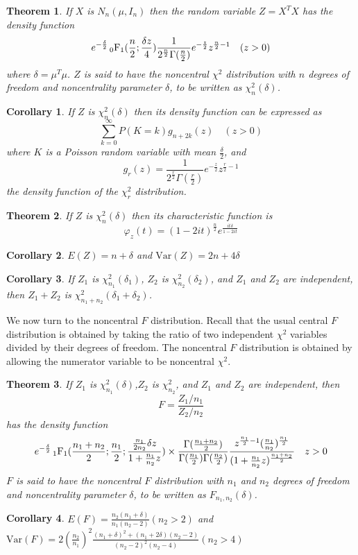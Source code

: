 \documentclass{article}
\newtheorem{Thm}{Theorem}[section]
\newtheorem{Cor}{Corollary}[Thm]
\theoremstyle{definition}
\begin{document}
\begin{Thm}
If $X$ is $N_n(\mu,I_n)$ then the random variable $Z=X^TX$ has the density function
\[e^{-\frac{\delta}{2}}\sideset{_0}{_1}{\operatorname{F}}(\frac{n}{2};\frac{\delta z}{4})\frac{1}{2^{\frac{n}{2}}\Gamma(\frac{n}{2})}e^{-\frac{z}{2}}z^{\frac{n}{2}-1}\quad(z>0)\]
where $\delta=\mu^T\mu$. $Z$ is said to have the noncentral $\chi^2$ distribution with $n$ degrees of freedom and noncentrality parameter $\delta$, to be written as $\chi^2_n(\delta)$.
\end{Thm}
\begin{Cor}
If $Z$ is $\chi^2_n(\delta)$ then its density function can be expressed as 
\[\sum_{k=0}^\infty P(K=k)g_{n+2k}(z)\quad (z>0)\]
where $K$ is a Poisson random variable with mean $\frac{\delta}{2}$, and 
\[g_r(z)=\frac{1}{2^{\frac{r}{2}}\Gamma(\frac{r}{2})}e^{-\frac{z}{2}}z^{\frac{r}{2}-1}\]
 the density function of the $\chi^2_r$ distribution.
\end{Cor}
\begin{Thm}
    If $Z$ is $\chi^2_n(\delta)$ then its characteristic function is 
\[\varphi_z(t)=(1-2it)^{\frac{n}{2}}e^{\frac{it\delta}{1-2it}}\]
\end{Thm}
\begin{Cor}
    $E(Z)=n+\delta$ and $\text{Var}(Z)=2n+4\delta$
\end{Cor}
\begin{Cor}
    If $Z_1$ is $\chi^2_{n_1}(\delta_1)$, $Z_2$ is $\chi^2_{n_2}(\delta_2)$, and $Z_1$ and $Z_2$ are independent, then $Z_1+Z_2$ is $\chi^2_{n_1+n_2}(\delta_1+\delta_2)$.
\end{Cor}
We now turn to the noncentral $F$ distribution. Recall that the usual central $F$ distribution is obtained by taking the ratio of two independent $\chi^2$ variables divided by their degrees of freedom.
The noncentral $F$ distribution is obtained by allowing the numerator variable to be noncentral $\chi^2$.
\begin{Thm}
    If $Z_1$ is $\chi^2_{n_1}(\delta)$,$Z_2$ is $\chi^2_{n_2}$, and $Z_1$ and $Z_2$ are independent, then 
    \[F=\frac{Z_1/n_1}{Z_2/n_2}\]
    has the density function 
    \[e^{-\frac{\delta}{2}}\sideset{_1}{_1}{\operatorname{F}}(\frac{n_1+n_2}{2};\frac{n_1}{2};\frac{\frac{n_1}{2n_2}\delta z}{1+\frac{n_1}{n_2}z})\times\frac{\Gamma(\frac{n_1+n_2}{2})}{\Gamma(\frac{n_1}{2})\Gamma(\frac{n_2}{2})}\frac{z^{\frac{n_1}{2}-1}(\frac{n_1}{n_2})^\frac{n_1}{2}}{(1+\frac{n_1}{n_2}z)^{\frac{n_1+n_2}{2}}}\quad z>0\]
$F$ is said to have the noncentral $F$ distribution with $n_1$ and $n_2$ degrees of freedom and noncentrality parameter $\delta$, to be written as $F_{n_1,n_2}(\delta)$.
\end{Thm}
\begin{Cor}
    $E(F)=\frac{n_2(n_1+\delta)}{n_1(n_2-2)}(n_2>2)$ and $\text{Var}(F)=2(\frac{n_2}{n_1})^2\frac{(n_1+\delta)^2+(n_1+2\delta)(n_2-2)}{(n_2-2)^2(n_2-4)}(n_2>4)$
\end{Cor}
\end{document}
